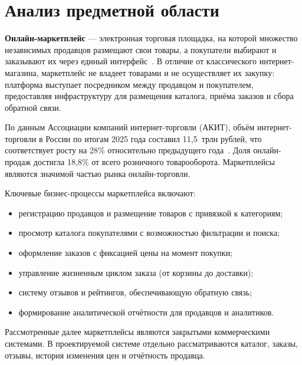 
\section{Анализ предметной области}

\textbf{Онлайн-маркетплейс} --- электронная торговая площадка, на которой множество независимых продавцов размещают свои товары, а покупатели выбирают и заказывают их через единый интерфейс~\cite{marketplace_def}. В отличие от классического интернет-магазина, маркетплейс не владеет товарами и не осуществляет их закупку: платформа выступает посредником между продавцом и покупателем, предоставляя инфраструктуру для размещения каталога, приёма заказов и сбора обратной связи.

По данным Ассоциации компаний интернет-торговли (АКИТ), объём интернет-торговли в России по итогам 2025 года составил 11,5~трлн рублей, что соответствует росту на 28\% относительно предыдущего года~\cite{akit2025}. Доля онлайн-продаж достигла 18,8\% от всего розничного товарооборота. Маркетплейсы являются значимой частью рынка онлайн-торговли.

Ключевые бизнес-процессы маркетплейса включают:

\begin{itemize}
    \item регистрацию продавцов и размещение товаров с привязкой к категориям;
    \item просмотр каталога покупателями с возможностью фильтрации и поиска;
    \item оформление заказов с фиксацией цены на момент покупки;
    \item управление жизненным циклом заказа (от корзины до доставки);
    \item систему отзывов и рейтингов, обеспечивающую обратную связь;
    \item формирование аналитической отчётности для продавцов и аналитиков.
\end{itemize}

Рассмотренные далее маркетплейсы являются закрытыми коммерческими системами. В проектируемой системе отдельно рассматриваются каталог, заказы, отзывы, история изменения цен и отчётность продавца.
